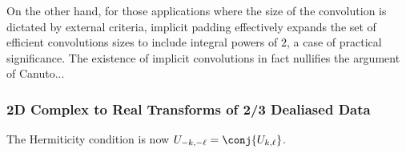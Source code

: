 \documentclass[final]{siamltex}
\def\ee{\end{dmath*}}
\def\bec{\begin{dmath*}[compact]}
\def\no{\hiderel}
\begin{document}
On the other hand, for those applications where the size of the convolution
is dictated by external criteria, implicit padding effectively expands the
set of efficient convolutions sizes to include integral powers of $2$, a
case of practical significance. The existence of implicit convolutions in
fact nullifies the argument of Canuto...

\subsubsection{2D Complex to Real Transforms of 2/3 Dealiased Data}
The Hermiticity condition is now $U_{-k,-\ell}=\conj{U_{k,\ell}}$.

\end{document}
